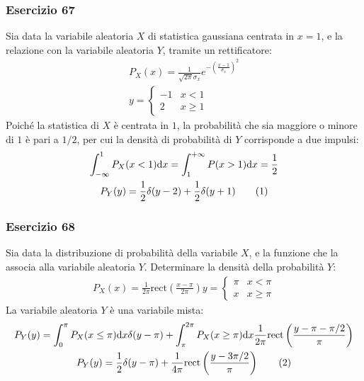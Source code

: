 \documentclass{article}
\newcommand{\rect}{\mathrm{rect}}
\newcommand{\df}{\mathrm{d}}
\newcommand{\tageq}{\tag{\stepcounter{equation}\theequation}}
\begin{document}
\subsubsection*{Esercizio 67}

Sia data la variabile aleatoria $X$ di statistica gaussiana centrata in $x=1$, e la relazione con la variabile aleatoria $Y$, tramite un rettificatore:
\begin{gather*}
    P_X(x)=\displaystyle\frac{1}{\sqrt{2\pi}\sigma_x}e^{-\left(\frac{x-1}{\sigma_x}\right)^2}\\
    y=\begin{cases}
        -1&x< 1\\
        2&x\geq 1
    \end{cases}
\end{gather*}
Poiché la statistica di $X$ è centrata in $1$, la probabilità che sia maggiore o minore di $1$ è pari a $1/2$, per cui la densità di probabilità di 
$Y$ corrisponde a due impulsi:
\begin{gather*}
    \displaystyle\int_{-\infty}^1P_X(x<1)\df x=\int_{1}^{+\infty}P(x>1)\df x=\frac{1}{2}\\
    P_Y(y)=\displaystyle\frac{1}{2}\delta(y-2)+\frac{1}{2}\delta(y+1)\tageq
\end{gather*}

\subsubsection*{Esercizio 68}

Sia data la distribuzione di probabilità della variabile $X$, e la funzione che la associa alla variabile aleatoria $Y$. Determinare la densità della probabilità $Y$:
\begin{gather*}
    P_X(x)=\displaystyle\frac{1}{2\pi}\rect\left(\frac{x-\pi}{2\pi}\right)
    y=\begin{cases}
        \pi &x<\pi\\
        x &x\geq\pi
    \end{cases}
\end{gather*}
La variabile aleatoria $Y$ è una variabile mista:
\begin{gather*}
    P_Y(y)=\displaystyle\int_0^{\pi}P_X(x\leq\pi)\df x\delta(y-\pi)+\int_{\pi}^{2\pi}P_X(x\geq\pi)\df x \frac{1}{2\pi}\rect\left(\frac{y-\pi-\pi/2}{\pi}\right)\\
    P_Y(y)=\displaystyle\frac{1}{2}\delta(y-\pi)+\frac{1}{4\pi}\rect\left(\frac{y-3\pi/2}{\pi}\right)\tageq
\end{gather*}
\end{document}
